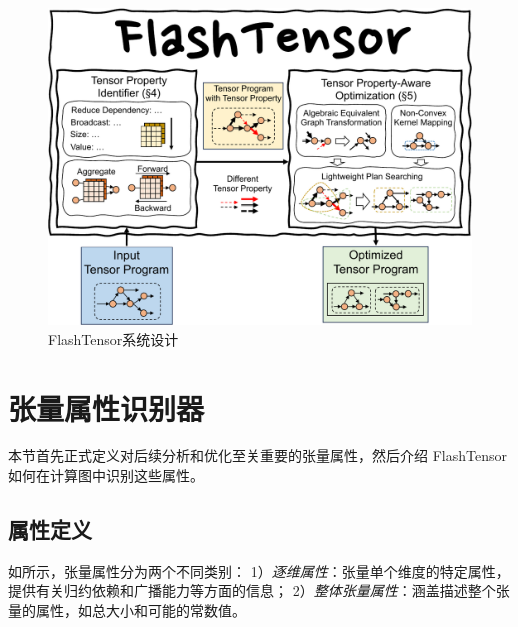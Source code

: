 \begin{figure}[h]
    \centering
    \includegraphics[width=0.6\linewidth]{figures/flashtensor/overview-ft-crop.pdf}
    \caption{FlashTensor系统设计}
    \label{fig:flashtensor-overview}
\end{figure}



\section{张量属性识别器}
本节首先正式定义对后续分析和优化至关重要的张量属性，然后介绍 FlashTensor 如何在计算图中识别这些属性。



\subsection{属性定义}
如所示，张量属性分为两个不同类别：
1）\textit{逐维属性}：张量单个维度的特定属性，提供有关归约依赖和广播能力等方面的信息；
2）\textit{整体张量属性}：涵盖描述整个张量的属性，如总大小和可能的常数值。

